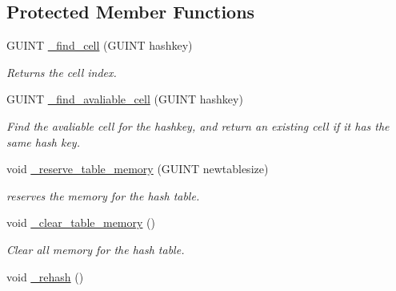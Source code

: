 \subsection*{Protected Member Functions}
\begin{CompactItemize}
\item 
\hypertarget{classgim__hash__table_aaff4cea9e6b86276d364041e651605f}{
GUINT \hyperlink{classgim__hash__table_aaff4cea9e6b86276d364041e651605f}{\_\-find\_\-cell} (GUINT hashkey)}
\label{classgim__hash__table_aaff4cea9e6b86276d364041e651605f}

\begin{CompactList}\small\item\em Returns the cell index. \item\end{CompactList}\item 
\hypertarget{classgim__hash__table_cc2d3d29a0190232386fb155ec9e5d8f}{
GUINT \hyperlink{classgim__hash__table_cc2d3d29a0190232386fb155ec9e5d8f}{\_\-find\_\-avaliable\_\-cell} (GUINT hashkey)}
\label{classgim__hash__table_cc2d3d29a0190232386fb155ec9e5d8f}

\begin{CompactList}\small\item\em Find the avaliable cell for the hashkey, and return an existing cell if it has the same hash key. \item\end{CompactList}\item 
void \hyperlink{classgim__hash__table_4d9347e131c0e17ac2d4966c092817f8}{\_\-reserve\_\-table\_\-memory} (GUINT newtablesize)
\begin{CompactList}\small\item\em reserves the memory for the hash table. \item\end{CompactList}\item 
\hypertarget{classgim__hash__table_06933fdb198971dcd753564d1d6e9424}{
void \hyperlink{classgim__hash__table_06933fdb198971dcd753564d1d6e9424}{\_\-clear\_\-table\_\-memory} ()}
\label{classgim__hash__table_06933fdb198971dcd753564d1d6e9424}

\begin{CompactList}\small\item\em Clear all memory for the hash table. \item\end{CompactList}\item 
\hypertarget{classgim__hash__table_a33115e75d8cc5c489fa6ce8b1a23654}{
void \hyperlink{classgim__hash__table_a33115e75d8cc5c489fa6ce8b1a23654}{\_\-rehash} ()}
\label{classgim__hash__table_a33115e75d8cc5c489fa6ce8b1a23654}


\end{CompactItemize}
